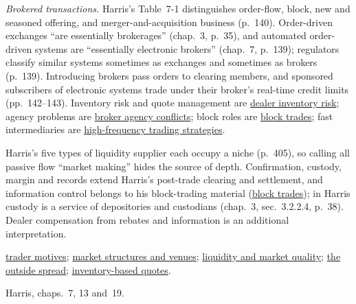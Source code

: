 \begin{qfdefinition}
 \emph{Brokered transactions.} Harris's Table~7-1 distinguishes order-flow, block, new and seasoned offering, and merger-and-acquisition business (p.~140). Order-driven exchanges ``are essentially brokerages'' (chap.~3, p.~35), and automated order-driven systems are ``essentially electronic brokers'' (chap.~7, p.~139); regulators classify similar systems sometimes as exchanges and sometimes as brokers (p.~139). Introducing brokers pass orders to clearing members, and sponsored subscribers of electronic systems trade under their broker's real-time credit limits (pp.~142--143). Inventory risk and quote management are \hyperref[def:dealer-inventory-risk]{dealer inventory risk}; agency problems are \hyperref[def:broker-agency-conflicts]{broker agency conflicts}; block roles are \hyperref[def:block-trade]{block trades}; fast intermediaries are \hyperref[def:hft-strategies]{high-frequency trading strategies}.

 Harris's five types of liquidity supplier each occupy a niche (p.~405), so calling all passive flow ``market making'' hides the source of depth. Confirmation, custody, margin and records extend Harris's post-trade clearing and settlement, and information control belongs to his block-trading material (\hyperref[def:block-trade]{block trades}); in Harris custody is a service of depositories and custodians (chap.~3, sec.~3.2.2.4, p.~38). Dealer compensation from rebates and information is an additional interpretation.

 \hyperref[def:trader-motives]{trader motives}; \hyperref[def:market-structures-venues]{market structures and venues}; \hyperref[def:liquidity-dimensions]{liquidity and market quality}; \hyperref[def:outside-spread]{the outside spread}; \hyperref[mod:inventory-based-quotes]{inventory-based quotes}.

 Harris, chaps.~7, 13 and~19.

\end{qfdefinition}

